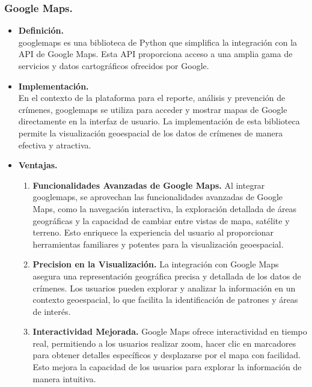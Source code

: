 \documentclass{article}
\begin{document}
        \subsubsection{Google Maps.}
            \begin{itemize}
                \item \textbf{Definición.}\\
                googlemaps es una biblioteca de Python que simplifica la integración con la API de Google Maps. Esta API proporciona acceso a una amplia gama de servicios y datos cartográficos ofrecidos por Google.

                \item \textbf{Implementación.}\\
                En el contexto de la plataforma para el reporte, análisis y prevención de crímenes, googlemaps se utiliza para acceder y mostrar mapas de Google directamente en la interfaz de usuario. La implementación de esta biblioteca permite la visualización geoespacial de los datos de crímenes de manera efectiva y atractiva.

                \item \textbf{Ventajas.}\\
                \begin{enumerate}
                    \item \textbf{Funcionalidades Avanzadas de Google Maps.} Al integrar googlemaps, se aprovechan las funcionalidades avanzadas de Google Maps, como la navegación interactiva, la exploración detallada de áreas geográficas y la capacidad de cambiar entre vistas de mapa, satélite y terreno. Esto enriquece la experiencia del usuario al proporcionar herramientas familiares y potentes para la visualización geoespacial.

                    \item \textbf{Precision en la Visualización.} La integración con Google Maps asegura una representación geográfica precisa y detallada de los datos de crímenes. Los usuarios pueden explorar y analizar la información en un contexto geoespacial, lo que facilita la identificación de patrones y áreas de interés.

                    \item \textbf{Interactividad Mejorada.} Google Maps ofrece interactividad en tiempo real, permitiendo a los usuarios realizar zoom, hacer clic en marcadores para obtener detalles específicos y desplazarse por el mapa con facilidad. Esto mejora la capacidad de los usuarios para explorar la información de manera intuitiva.


\end{enumerate}
\end{itemize}
\end{document}
